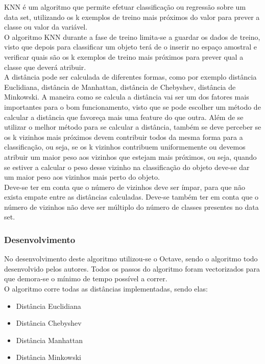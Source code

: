 \documentclass[portugues,final]{revdetua}
\begin{document}
KNN é um algoritmo que permite efetuar classificação ou regressão sobre um data set, utilizando os k exemplos de treino mais próximos do valor para prever a classe ou valor da variável.\\

O algoritmo KNN durante a fase de treino limita-se a guardar os dados de treino, visto que depois para classificar um objeto terá de o inserir no espaço amostral e verificar quais são os k exemplos de treino mais próximos para prever qual a classe que deverá atribuir.\\

A distância pode ser calculada de diferentes formas, como por exemplo distância Euclidiana, distância de Manhattan, distância de Chebyshev, distância de Minkowski. A maneira como se calcula a distância vai ser um dos fatores mais importantes para o bom funcionamento, visto que se pode escolher um método de calcular a distância que favoreça mais uma feature do que outra. Além de se utilizar o melhor método para se calcular a distância, também se deve perceber se os k vizinhos mais próximos devem contribuir todos da mesma forma para a classificação, ou seja, se os k vizinhos contribuem uniformemente ou devemos atribuir um maior peso aos vizinhos que estejam mais próximos, ou seja, quando se estiver a calcular o peso desse vizinho na classificação do objeto deve-se dar um maior peso aos vizinhos mais perto do objeto.\\

Deve-se ter em conta que o número de vizinhos deve ser ímpar, para que não exista empate entre as distâncias calculadas. Deve-se também ter em conta que o número de vizinhos não deve ser múltiplo do número de classes presentes no data set.\\

\subsubsection{Desenvolvimento}

No desenvolvimento deste algoritmo utilizou-se o Octave, sendo o algoritmo todo desenvolvido pelos autores. Todos os passos do algoritmo foram vectorizados para que demora-se o mínimo de tempo possível a correr.\\

O algoritmo corre todas as distâncias implementadas, sendo elas:

\begin{itemize}
	\item Distância Euclidiana
	\item Distância Chebyshev
	\item Distância Manhattan
	\item Distância Minkowski
\end{itemize}
\end{document}
